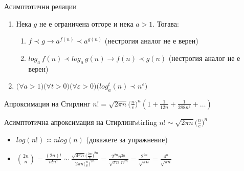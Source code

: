 \begin{boxmainproperties}{Асимптотични релации}{}
\begin{enumerate}
			  Обратната посока $\textbf{не}$ е вярна.
		\item Нека $g$ не е ограничена отгоре и нека $a>1$. Тогава:
			  \begin{enumerate}
			  	\item $f\prec g\rightarrow a^{f(n)}\prec a^{g(n)}$ (нестрогия аналог $\textbf{не}$ е верен)
			  	\item $log_a\,f(n)\prec log_a\,g(n)\rightarrow f(n)\prec g(n)$ (нестрогия аналог $\textbf{не}$ е верен)
			  \end{enumerate}
		\item $\big(\forall a>1\big)\big(\forall t>0\big)\big(\forall\varepsilon>0\big)\big(log_a^t(n)\prec n^\varepsilon\big)$
	\end{enumerate}
\end{boxmainproperties}

\begin{boxfact}{Апроксимация на Стирлинг}{}
	$n!=\sqrt{2\pi n}\big(\frac{n}{e}\big)^n(1+\frac{1}{12n}+\frac{1}{288n^2}+\dots)$
\end{boxfact}

\begin{boxcorollary}{Асимптотична апроксимация на Стирлинг}{stirling}%
	$n!\sim\sqrt{2\pi n}\big(\frac{n}{e}\big)^n$
\end{boxcorollary}

\begin{application*}
	\leavevmode
	\begin{itemize}
		\item $log(n!)\asymp nlog(n)$ (докажете за упражнение)
		\item $\binom{2n}{n}=\frac{(2n)!}{n!n!}\sim\frac{\sqrt{4\pi n}\big(\frac{2n}{e}\big)^{2n}}{2\pi n\big(\frac{n}{e}\big)^{2n}}=\frac{2^{2n}n^{2n}}{\sqrt{\pi n}\,n^{2n}}=\frac{2^{2n}}{\sqrt{\pi n}}=\frac{4^n}{\sqrt{\pi n}}$
	\end{itemize}
\end{application*}

